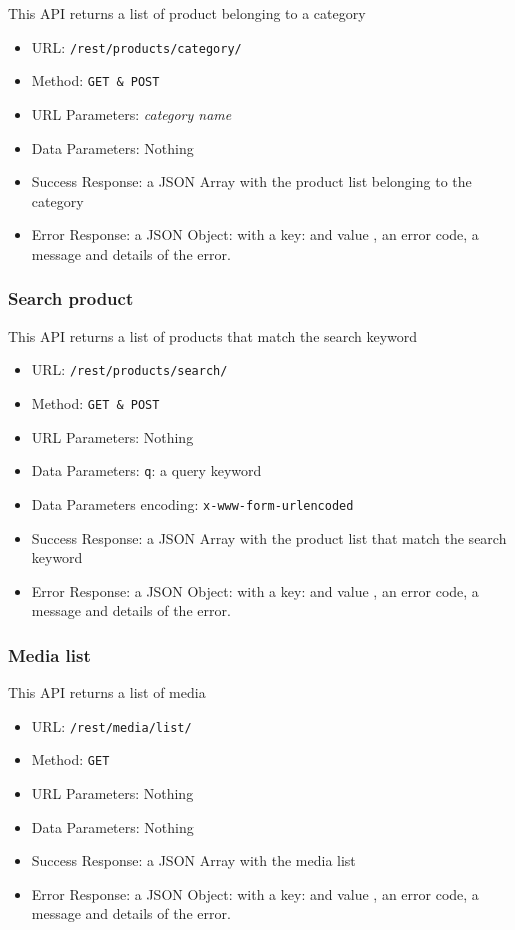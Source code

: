 This API returns a list of product belonging to a category

\begin{itemize}
    \item URL: \texttt{/rest/products/category/}
    \item Method: \texttt{GET \& POST}
    \item URL Parameters: \textit{category name}
    \item Data Parameters: Nothing
    \item Success Response: a JSON Array with the product list  belonging to the category
    \item Error Response: a JSON Object: with a key:   and value , an error code, a message and details of the error.
\end{itemize}

\subsubsection*{Search product}

This API returns a list of products that match the search keyword

\begin{itemize}
    \item URL: \texttt{/rest/products/search/}
    \item Method: \texttt{GET \& POST}
    \item URL Parameters: Nothing
    \item Data Parameters: \texttt{q}: a query keyword
    \item Data Parameters encoding: \texttt{x-www-form-urlencoded}
    \item Success Response: a JSON Array with the product list  that match the search keyword
    \item Error Response: a JSON Object: with a key:   and value , an error code, a message and details of the error.
\end{itemize}

\subsubsection*{Media list}

This API returns a list of media

\begin{itemize}
    \item URL: \texttt{/rest/media/list/}
    \item Method: \texttt{GET}
    \item URL Parameters: Nothing
    \item Data Parameters: Nothing
    \item Success Response: a JSON Array with the media list
    \item Error Response: a JSON Object: with a key:   and value , an error code, a message and details of the error.
\end{itemize}

